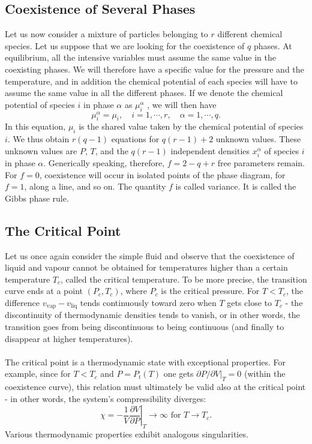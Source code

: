 \subsection{Coexistence of Several Phases}
Let us now consider a mixture of particles belonging to $r$ different chemical species. Let us suppose that we are looking for the coexistence of $q$ phases. At equilibrium, all the intensive variables must assume the same value in the coexisting phases. We will therefore have a specific value for the pressure and the temperature, and in addition the chemical potential of each species will have to assume the same value in all the different phases. If we denote the chemical potential of species $i$ in phase $\alpha$ as $\mu_i^{\alpha}$ , we will then have
\[\mu_{i}^{\alpha} = \mu_i , \quad i = 1,\cdots,r , \quad \alpha = 1,\cdots,q.\]
In this equation, $\mu_i$ is the shared value taken by the chemical potential of species $i$. We
thus obtain $r(q-1)$ equations for $q(r-1)+2$ unknown values. These unknown values are $P$, $T$, and the $q(r-1)$ independent densities $x_i^{\alpha}$ of species $i$ in phase $\alpha$. Generically speaking, therefore, $f = 2 - q + r$ free parameters remain. For $f = 0$, coexistence will occur in isolated points of the phase diagram, for $f = 1$, along a line, and so on. The quantity $f$ is called variance.  It is called the Gibbs phase rule.

\subsection{The Critical Point}
Let us once again consider the simple fluid and observe that the coexistence of liquid and vapour cannot be obtained for temperatures higher than a certain temperature $T_c$, called the critical temperature. To be more precise, the transition curve ends at a point $(P_c,T_c)$, where $P_c$ is the critical pressure. For $T < T_c$, the difference $v_{\mathrm{vap}}-v_{\mathrm{liq}}$ tends continuously toward zero when $T$ gets close to $T_c$ - the discontinuity of thermodynamic densities tends to vanish, or in other words, the transition goes from being discontinuous to being continuous (and finally to disappear at higher temperatures).
\\ \\
The critical point is a thermodynamic state with exceptional properties. For example, since for $T < T_c$ and $P = P_t(T)$ one gets $\partial P / \partial V |_{T} = 0$ (within the coexistence curve), this relation must ultimately be valid also at the critical point - in other words, the system's compressibility diverges:
\[\chi = - \frac{1}{V} \left. \frac{\partial V}{\partial P} \right|_{T} \to \infty \mbox{ for } T \to T_c .\]
Various thermodynamic properties exhibit analogous singularities.


